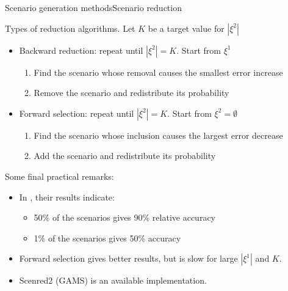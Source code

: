 \begin{frame}{Scenario generation methods}{Scenario reduction}

	Types of reduction algorithms. Let $K$ be a target value for $|\xi^2|$
	\vspace{-6pt}
	\begin{itemize}
		\item Backward reduction: repeat until $|\xi^2|=K$. Start from $\xi^1$ 
		\begin{enumerate}
			\item Find the scenario whose removal causes the \alert{smallest error increase}
			\item Remove the scenario and redistribute its probability
		\end{enumerate} 
		\item Forward selection: repeat until $|\xi^2|=K$. Start from $\xi^2 = \emptyset$
		\begin{enumerate}
			\item Find the scenario whose inclusion causes the \alert{largest error decrease}
			\item Add the scenario and redistribute its probability
		\end{enumerate} 
	\end{itemize}
	
	\pause
	Some final practical remarks:
	\vspace{-6pt}
	\begin{itemize}
		\item In {\small \cite{heitsch2003scenario}}, their results indicate:
		\begin{itemize}
			\item 50\% of the scenarios gives 90\% relative accuracy
			\item 1\% of the scenarios gives 50\% accuracy
		\end{itemize}
		\item \alert{Forward selection} gives better results, but is slow for large $|\xi^1|$ and $K$.
		\item \alert{Scenred2} (GAMS) is an available implementation.		
	\end{itemize} 
	
\end{frame}


